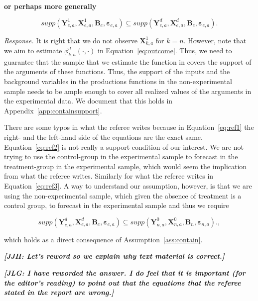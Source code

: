 \textbf{or perhaps more generally}

\begin{equation}
supp( \bm{Y}_{e,a}^1, \bm{X}^1_{e,a}, \bm{B}_e, \bm{\varepsilon}_{e,a} ) \subseteq supp( \bm{Y}_{e,a}^d, \bm{X}^d_{e,a}, \bm{B}_e, \bm{\varepsilon}_{e,a} ).  \label{eq:ref3}
\end{equation}

\noindent \textit{Response.} It is right that we do not observe $\bm{X}_{k,a}^1$ for $k = n$. However, note that we aim to estimate $\phi_{k,a}^d \left( \cdot, \cdot \right)$ in Equation~\eqref{eq:outcome}. Thus, we need to guarantee that the sample that we estimate the function in covers the support of the arguments of these functions. Thus, the support of the inputs and the background variables in the productions functions in the non-experimental sample needs to be ample enough to cover all realized values of the arguments in the experimental data. We document that this holds in Appendix~\ref{app:containsupport}. 

There are some typos in what the referee writes because in Equation~\eqref{eq:ref1} the right- and the left-hand side of the equations are the exact same. Equation~\eqref{eq:ref2} is not really a support condition of our interest. We are not trying to use the control-group in the experimental sample to forecast in the treatment-group in the experimental sample, which would seem the implication from what the referee writes. Similarly for what the referee writes in Equation~\eqref{eq:ref3}. A way to understand our assumption, however, is that we are using the non-experimental sample, which given the absence of treatment is a control group, to forecast in the experimental sample and thus we require

\begin{equation}
supp( \bm{Y}_{e,a}^d, \bm{X}^d_{e,a}, \bm{B}_e, \bm{\varepsilon}_{e,a} ) \subseteq supp( \bm{Y}_{n,a}^0, \bm{X}^0_{n,a}, \bm{B}_n, \bm{\varepsilon}_{n,a} ).  \label{eq:ref4},
\end{equation}

which holds as a direct consequence of Assumption~\ref{ass:contain}. 

\textbf{\textit{[JJH: Let's reword so we explain why text material is correct.]}}

\textbf{\textit{[JLG: I have reworded the answer. I do feel that it is important (for the editor's reading) to point out that the equations that the referee stated in the report are wrong.]}}

